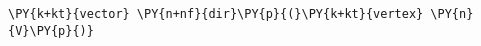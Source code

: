 \begin{Verbatim}[commandchars=\\\{\}]
    \PY{k+kt}{vector} \PY{n+nf}{dir}\PY{p}{(}\PY{k+kt}{vertex} \PY{n}{V}\PY{p}{)}
\end{Verbatim}
